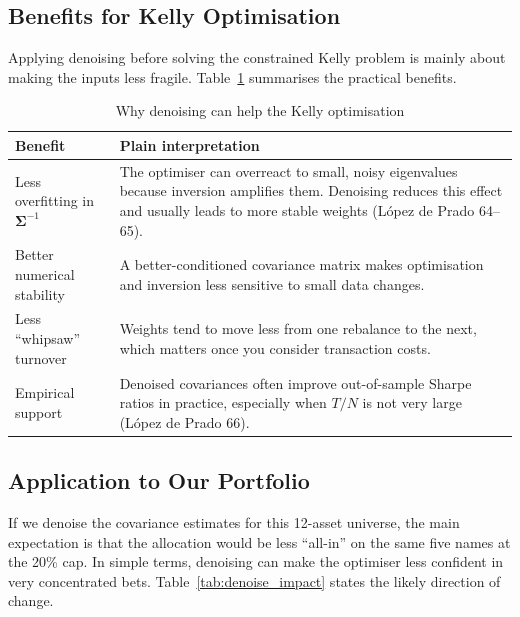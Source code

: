 \documentclass[11pt,a4paper]{article}
\begin{document}
\subsection{Benefits for Kelly Optimisation}

Applying denoising before solving the constrained Kelly problem is mainly about making
the inputs less fragile. Table~\ref{tab:denoise_benefits} summarises the practical
benefits.

\begin{table}[H]
\centering
\caption{Why denoising can help the Kelly optimisation}
\label{tab:denoise_benefits}
{\small\setlength{\tabcolsep}{4pt}\renewcommand{\arraystretch}{1.15}\begin{tabularx}{\textwidth}{>{\raggedright\arraybackslash}p{3.4cm} X}
\toprule
Benefit & Plain interpretation \\
\midrule
Less overfitting in $\bm{\Sigma}^{-1}$ & The optimiser can overreact to small, noisy eigenvalues because inversion amplifies them. Denoising reduces this effect and usually leads to more stable weights (L\'{o}pez de Prado 64--65). \\
Better numerical stability & A better-conditioned covariance matrix makes optimisation and inversion less sensitive to small data changes. \\
Less ``whipsaw'' turnover & Weights tend to move less from one rebalance to the next, which matters once you consider transaction costs. \\
Empirical support & Denoised covariances often improve out-of-sample Sharpe ratios in practice, especially when $T/N$ is not very large (L\'{o}pez de Prado 66). \\
\bottomrule
\end{tabularx}}
\end{table}

\subsection{Application to Our Portfolio}

If we denoise the covariance estimates for this 12-asset universe, the main expectation is
that the allocation would be less ``all-in'' on the same five names at the 20\% cap.
In simple terms, denoising can make the optimiser less confident in very concentrated bets.
Table~\ref{tab:denoise_impact} states the likely direction of change.
\end{document}
